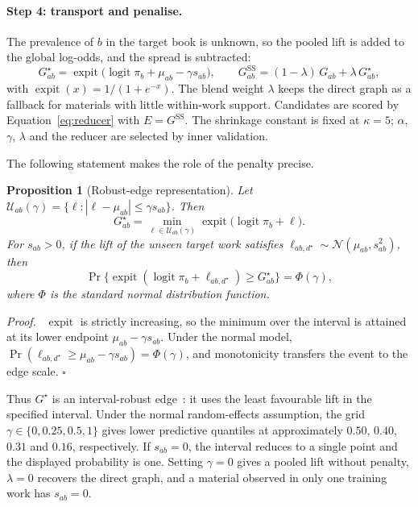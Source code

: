 \documentclass[applsci,article,submit,oneauthor]{Definitions/mdpi}
\newcommand{\logit}{\operatorname{logit}}
\newcommand{\expit}{\operatorname{expit}}
\newtheorem{xprop}{Proposition}
\newenvironment{xproof}{\par\noindent\textit{Proof.}\ }{\hfill$\square$\par\medskip}
\begin{document}
\paragraph{Step 4: transport and penalise.} The prevalence of $b$ in the target book is unknown, so the pooled lift is added to the global log-odds, and the spread is subtracted:
\begin{equation}
G^{\star}_{ab}=\expit\bigl(\logit\pi_b+\mu_{ab}-\gamma s_{ab}\bigr),\qquad
G^{\mathrm{SS}}_{ab}=(1-\lambda)\,G_{ab}+\lambda\,G^{\star}_{ab},
\label{eq:sscl}
\end{equation}
with $\expit(x)=1/(1+e^{-x})$. The blend weight $\lambda$ keeps the direct graph as a fallback for materials with little within-work support. Candidates are scored by Equation~\eqref{eq:reducer} with $E=G^{\mathrm{SS}}$. The shrinkage constant is fixed at $\kappa=5$; $\alpha$, $\gamma$, $\lambda$ and the reducer are selected by inner validation.

The following statement makes the role of the penalty precise.

\begin{xprop}[Robust-edge representation]
\label{prop:robust}
Let $\mathcal U_{ab}(\gamma)=\{\ell:|\ell-\mu_{ab}|\le\gamma s_{ab}\}$. Then
\begin{equation}
G^{\star}_{ab}=\min_{\ell\in\mathcal U_{ab}(\gamma)}\expit\bigl(\logit\pi_b+\ell\bigr).
\label{eq:robust}
\end{equation}
For $s_{ab}>0$, if the lift of the unseen target work satisfies $\ell_{ab,d^\star}\sim\mathcal N(\mu_{ab},s_{ab}^2)$, then
\begin{equation*}
\Pr\bigl\{\expit(\logit\pi_b+\ell_{ab,d^\star})\ge G^\star_{ab}\bigr\}=\Phi(\gamma),
\end{equation*}
where $\Phi$ is the standard normal distribution function.
\end{xprop}
\begin{xproof}
$\expit$ is strictly increasing, so the minimum over the interval is attained at its lower endpoint $\mu_{ab}-\gamma s_{ab}$. Under the normal model, $\Pr(\ell_{ab,d^\star}\ge\mu_{ab}-\gamma s_{ab})=\Phi(\gamma)$, and monotonicity transfers the event to the edge scale.
\end{xproof}

Thus $G^\star$ is an interval-robust edge~\cite{bental2009}: it uses the least favourable lift in the specified interval. Under the normal random-effects assumption, the grid $\gamma\in\{0,0.25,0.5,1\}$ gives lower predictive quantiles at approximately $0.50$, $0.40$, $0.31$ and $0.16$, respectively. If $s_{ab}=0$, the interval reduces to a single point and the displayed probability is one. Setting $\gamma=0$ gives a pooled lift without penalty, $\lambda=0$ recovers the direct graph, and a material observed in only one training work has $s_{ab}=0$.
\end{document}
